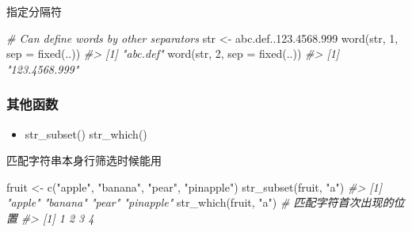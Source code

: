 \documentclass[
]{book}
\newenvironment{Shaded}{\begin{snugshade}}{\end{snugshade}}
\newcommand{\AttributeTok}[1]{\textcolor[rgb]{0.77,0.63,0.00}{#1}}
\newcommand{\CommentTok}[1]{\textcolor[rgb]{0.56,0.35,0.01}{\textit{#1}}}
\newcommand{\DecValTok}[1]{\textcolor[rgb]{0.00,0.00,0.81}{#1}}
\newcommand{\FunctionTok}[1]{\textcolor[rgb]{0.00,0.00,0.00}{#1}}
\newcommand{\NormalTok}[1]{#1}
\newcommand{\OtherTok}[1]{\textcolor[rgb]{0.56,0.35,0.01}{#1}}
\newcommand{\StringTok}[1]{\textcolor[rgb]{0.31,0.60,0.02}{#1}}
\providecommand{\tightlist}{%
  \setlength{\itemsep}{0pt}\setlength{\parskip}{0pt}}
\begin{document}
指定分隔符

\begin{Shaded}
\begin{Highlighting}[]
\CommentTok{\# Can define words by other separators}
\NormalTok{str }\OtherTok{\textless{}{-}} \StringTok{\textquotesingle{}abc.def..123.4568.999\textquotesingle{}}
\FunctionTok{word}\NormalTok{(str, }\DecValTok{1}\NormalTok{, }\AttributeTok{sep =} \FunctionTok{fixed}\NormalTok{(}\StringTok{\textquotesingle{}..\textquotesingle{}}\NormalTok{))}
\CommentTok{\#\textgreater{} [1] "abc.def"}
\FunctionTok{word}\NormalTok{(str, }\DecValTok{2}\NormalTok{, }\AttributeTok{sep =} \FunctionTok{fixed}\NormalTok{(}\StringTok{\textquotesingle{}..\textquotesingle{}}\NormalTok{))}
\CommentTok{\#\textgreater{} [1] "123.4568.999"}
\end{Highlighting}
\end{Shaded}

\hypertarget{ux5176ux4ed6ux51fdux6570}{%
\subsubsection{其他函数}\label{ux5176ux4ed6ux51fdux6570}}

\begin{itemize}
\tightlist
\item
  str\_subset() str\_which()
\end{itemize}

匹配字符串本身行筛选时候能用

\begin{Shaded}
\begin{Highlighting}[]

\NormalTok{fruit }\OtherTok{\textless{}{-}} \FunctionTok{c}\NormalTok{(}\StringTok{"apple"}\NormalTok{, }\StringTok{"banana"}\NormalTok{, }\StringTok{"pear"}\NormalTok{, }\StringTok{"pinapple"}\NormalTok{)}
\FunctionTok{str\_subset}\NormalTok{(fruit, }\StringTok{"a"}\NormalTok{)}
\CommentTok{\#\textgreater{} [1] "apple"    "banana"   "pear"     "pinapple"}
\FunctionTok{str\_which}\NormalTok{(fruit, }\StringTok{"a"}\NormalTok{) }\CommentTok{\# 匹配字符首次出现的位置}
\CommentTok{\#\textgreater{} [1] 1 2 3 4}
\end{Highlighting}
\end{Shaded}
\end{document}
